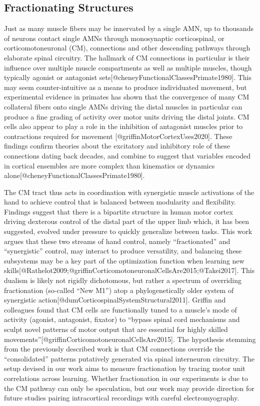 \documentclass[../main.tex]{subfiles}
\begin{document}
\subsection{Fractionating Structures}\label{fractionating-structures}

Just as many muscle fibers may be innervated by a single AMN, up to thousands of neurons contact single AMNs through monosynaptic corticospinal, or corticomotoneuronal (CM), connections and other descending pathways through elaborate spinal circuitry. The hallmark of CM connections in particular is their influence over multiple muscle compartments as well as multiple muscles, though typically agonist or antagonist sets{[}@cheneyFunctionalClassesPrimate1980{]}. This may seem counter-intuitive as a means to produce individuated movement, but experimental evidence in primates has shown that the convergence of many CM collateral fibers onto single AMNs driving the distal muscles in particular can produce a fine grading of activity over motor units driving the distal joints. CM cells also appear to play a role in the inhibition of antagonist muscles prior to contractions required for movement {[}@griffinMotorCortexUses2020{]}. These findings confirm theories about the excitatory and inhibitory role of these connections dating back decades, and combine to suggest that variables encoded in cortical ensembles are more complex than kinematics or dynamics alone{[}@cheneyFunctionalClassesPrimate1980{]}.

The CM tract thus acts in coordination with synergistic muscle activations of the hand to achieve control that is balanced between modularity and flexibility. Findings suggest that there is a bipartite structure in human motor cortex driving dexterous control of the distal part of the upper limb which, it has been suggested, evolved under pressure to quickly generalize between tasks. This work argues that these two streams of hand control, namely ``fractionated'' and ``synergistic'' control, may interact to produce versatility, and balancing these subsystems may be a key part of the optimization function when learning new skills{[}@Rathelot2009;@griffinCorticomotoneuronalCellsAre2015;@Takei2017{]}. This dualism is likely not rigidly dichotomous, but rather a spectrum of overriding fractionation (so-called ``New M1'') atop a phylogenetically older system of synergistic action{[}@dumCorticospinalSystemStructural2011{]}. Griffin and colleagues found that CM cells are functionally tuned to a muscle's mode of activity (agonist, antagonist, fixator) to ``bypass spinal cord mechanisms and sculpt novel patterns of motor output that are essential for highly skilled movements''{[}@griffinCorticomotoneuronalCellsAre2015{]}. The hypothesis stemming from the previously described work is that CM connections override the ``consolidated'' patterns putatively generated via spinal interneuron circuitry. The setup devised in our work aims to measure fractionation by tracing motor unit correlations across learning. Whether fractionation in our experiments is due to the CM pathway can only be speculation, but our work may provide direction for future studies pairing intracortical recordings with careful electromyography.
\end{document}
